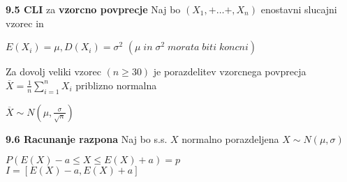 \documentclass{article}
\begin{document}
\begin{multicols}{3}
\textbf{9.5 CLI} za \textbf{vzorcno povprecje}
Naj bo  $(X_1, + \dots +, X_n)$ enostavni slucajni vzorec in
\begin{center}
    \begin{math}
        E(X_i) = \mu, D(X_i) = \sigma^2
    \end{math}
    \begin{math}
        (\mu\; in\; \sigma^2\; morata\; biti\; koncni)
    \end{math}
\end{center}
Za dovolj veliki vzorec $(n \geq 30)$ je porazdelitev vzorcnega povprecja
$\overline{X} = \frac{1}{n} \sum_{i = 1}^{n} X_i$ priblizno normalna
\begin{center}
    \begin{math}
        \overline{X} \sim N(\mu, \frac{\sigma}{\sqrt{n}})
    \end{math}
\end{center}

\textbf{9.6 Racunanje razpona}
Naj bo s.s. $X$ normalno porazdeljena $X \sim N(\mu, \sigma)$
\begin{center}
    \begin{math}
        P(E(X) - a \leq X \leq E(X) + a) = p
    \end{math}\\
    \begin{math}
        I = [E(X) -a, E(X) + a]
    \end{math}
\end{center}


\bigskip
\end{multicols}
\end{document}
